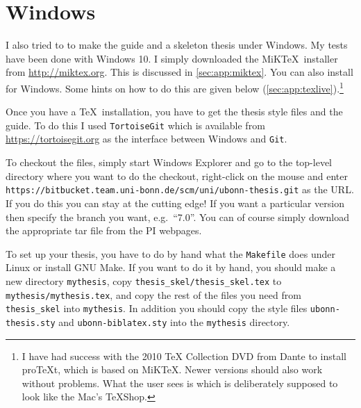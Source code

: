 

\section{Windows}%
\label{sec:app:windows}

I also tried to to make the guide and a skeleton thesis under Windows. 
My tests have been done with Windows 10.
I simply downloaded the MiK\TeX\ installer from \url{http://miktex.org}.
This is discussed in \cref{sec:app:miktex}.
You can also install \TeXLive for Windows. Some hints on how to do
this are given below (\cref{sec:app:texlive}).\footnote{%
I have had success with the 2010 \TeX{} Collection DVD from Dante to install
pro\TeX t, which is based on MiK\TeX.
Newer versions should also work without problems.
What the user sees is \TeXworks
which is deliberately supposed to look like the Mac's \TeX Shop.}

Once you have a \TeX\ installation, you have to get the thesis style files and the guide.
To do this I used \texttt{TortoiseGit} which is available from
\url{https://tortoisegit.org} as the interface between Windows and
\texttt{Git}.

To checkout the files, simply start Windows Explorer and go to the
top-level directory where you want to do the checkout, right-click on
the mouse and enter\\
\texttt{https://bitbucket.team.uni-bonn.de/scm/uni/ubonn-thesis.git}
as the URL\@.
If you do this you can stay at the cutting edge!
If you want a particular version then specify the branch you want, e.g.\ \enquote{7.0}.
You can of course simply download the appropriate tar file from the PI webpages.

To set up your thesis, you have to do by hand what the
\texttt{Makefile} does under Linux or install GNU Make.
If you want to do it by hand, you should make a new directory
\texttt{mythesis}, copy \texttt{thesis\_skel/thesis\_skel.tex} to
\texttt{mythesis/mythesis.tex}, and copy the rest of the files you need from
\texttt{thesis\_skel} into \texttt{mythesis}. In addition you should
copy the style files \texttt{ubonn-thesis.sty} and \texttt{ubonn-biblatex.sty} into the
\texttt{mythesis} directory.

